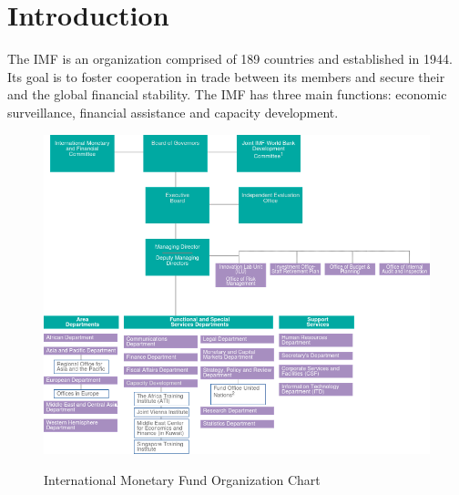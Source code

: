 \section{Introduction}
\label{sec:introduction}
The \gls{IMF} is an organization comprised of 189 countries and established in 1944. Its goal is to foster cooperation in trade between its members and secure their and the global financial stability. The \gls{IMF} has three main functions: economic surveillance, financial assistance and capacity development.

\begin{figure}[hbt]
\centering
\begin{minipage}[t]{.7\textwidth} %
\caption{International Monetary Fund Organization Chart} %
\includegraphics[width=1\textwidth]{img/orgchart}\\ %
\label{fig:orgchart}
\end{minipage}
\end{figure}
